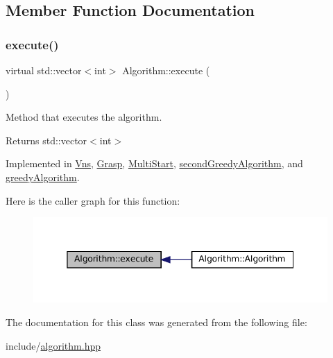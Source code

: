 \subsection{Member Function Documentation}
\mbox{\label{classAlgorithm_af6ea9eb9a6dbd41896e3fd7dabac096b}} 
\subsubsection{\texorpdfstring{execute()}{execute()}}
{\footnotesize\ttfamily virtual std\+::vector$<$int$>$ Algorithm\+::execute (\begin{DoxyParamCaption}{ }\end{DoxyParamCaption})\hspace{0.3cm}{\ttfamily [pure virtual]}}



Method that executes the algorithm. 

\begin{DoxyReturn}{Returns}
std\+::vector$<$int$>$ 
\end{DoxyReturn}


Implemented in \hyperlink{classVns_aece2ea2cb74dd3608570321fcbb2de0c}{Vns}, \hyperlink{classGrasp_a335b063bccd26b434dda3a3a69d6d711}{Grasp}, \hyperlink{classMultiStart_a9d842b1f602c4b8a47bf6d88d483ccae}{Multi\+Start}, \hyperlink{classsecondGreedyAlgorithm_a119a730116003d00438179ccf4e2cafd}{second\+Greedy\+Algorithm}, and \hyperlink{classgreedyAlgorithm_a37c81600b24a32ae25b6f0eeab643a7a}{greedy\+Algorithm}.

Here is the caller graph for this function\+:
\nopagebreak
\begin{figure}[H]
\begin{center}
\leavevmode
\includegraphics[width=345pt]{classAlgorithm_af6ea9eb9a6dbd41896e3fd7dabac096b_icgraph}
\end{center}
\end{figure}


The documentation for this class was generated from the following file\+:\begin{DoxyCompactItemize}
\item 
include/\hyperlink{algorithm_8hpp}{algorithm.\+hpp}\end{DoxyCompactItemize}
